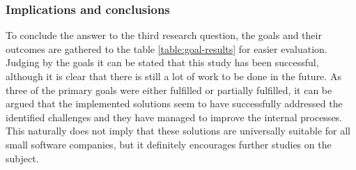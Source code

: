 \subsubsection*{Implications and conclusions}

To conclude the answer to the third research question, the goals and their outcomes are gathered to the table \ref{table:goal-results} for easier evaluation. Judging by the goals it can be stated
that this study has been successful, although it is clear that there is still a lot of work to be done in the future. As three of the primary goals were either fulfilled or partially fulfilled, it can be
argued that the implemented solutions seem to have successfully addressed the identified challenges and they have managed to improve the internal processes.
This naturally does not imply that these solutions are universally suitable for all small software companies, but it definitely encourages further studies on the subject.

